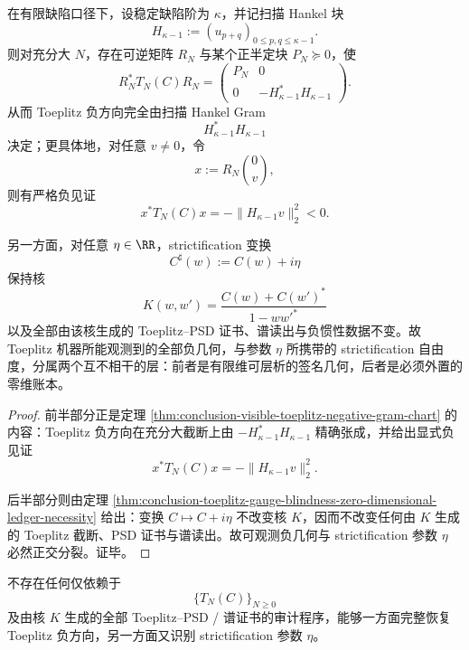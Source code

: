 \begin{theorem}\label{thm:conclusion-toeplitz-negative-geometry-strictification-orthogonal-split}
在有限缺陷口径下，设稳定缺陷阶为 \(\kappa\)，并记扫描 Hankel 块
\[
H_{\kappa-1}:=(u_{p+q})_{0\le p,q\le \kappa-1}.
\]
则对充分大 \(N\)，存在可逆矩阵 \(R_N\) 与某个正半定块 \(P_N\succeq 0\)，使
\[
R_N^*T_N(C)R_N=
\begin{pmatrix}
P_N & 0\\
0 & -H_{\kappa-1}^*H_{\kappa-1}
\end{pmatrix}.
\]
从而 Toeplitz 负方向完全由扫描 Hankel Gram
\[
H_{\kappa-1}^*H_{\kappa-1}
\]
决定；更具体地，对任意 \(v\neq 0\)，令
\[
x:=R_N\binom{0}{v},
\]
则有严格负见证
\[
x^*T_N(C)x=-\|H_{\kappa-1}v\|_2^2<0.
\]

另一方面，对任意 \(\eta\in\RR\)，strictification 变换
\[
C^\sharp(w):=C(w)+i\eta
\]
保持核
\[
K(w,w')=\frac{C(w)+C(w')^\ast}{1-ww'^\ast}
\]
以及全部由该核生成的 Toeplitz--PSD 证书、谱读出与负惯性数据不变。故 Toeplitz 机器所能观测到的全部负几何，与参数 \(\eta\) 所携带的 strictification 自由度，分属两个互不相干的层：前者是有限维可层析的签名几何，后者是必须外置的零维账本。
\end{theorem}

\begin{proof}
前半部分正是定理 \ref{thm:conclusion-visible-toeplitz-negative-gram-chart} 的内容：Toeplitz 负方向在充分大截断上由 \(-H_{\kappa-1}^*H_{\kappa-1}\) 精确张成，并给出显式负见证
\[
x^*T_N(C)x=-\|H_{\kappa-1}v\|_2^2.
\]

后半部分则由定理 \ref{thm:conclusion-toeplitz-gauge-blindness-zero-dimensional-ledger-necessity} 给出：变换 \(C\mapsto C+i\eta\) 不改变核 \(K\)，因而不改变任何由 \(K\) 生成的 Toeplitz 截断、PSD 证书与谱读出。故可观测负几何与 strictification 参数 \(\eta\) 必然正交分裂。证毕。
\end{proof}

\begin{corollary}\label{cor:conclusion-no-pure-toeplitz-audit-recovers-negative-directions-and-eta}
不存在任何仅依赖于
\[
\{T_N(C)\}_{N\ge 0}
\]
及由核 \(K\) 生成的全部 Toeplitz--PSD / 谱证书的审计程序，能够一方面完整恢复 Toeplitz 负方向，另一方面又识别 strictification 参数 \(\eta\)。
\end{corollary}

